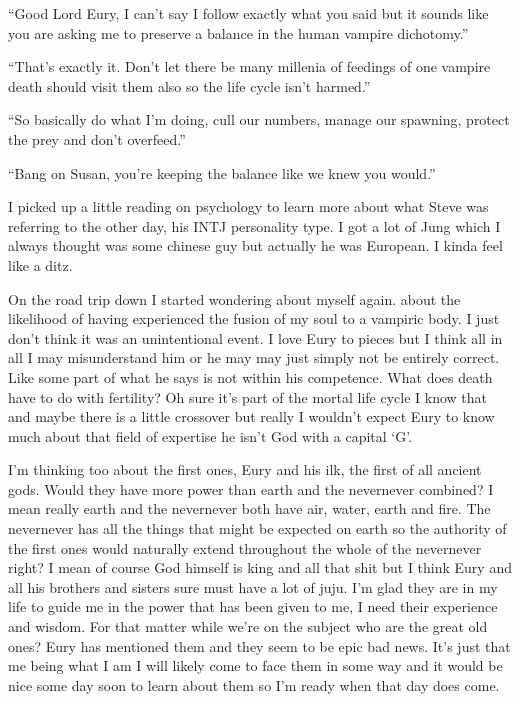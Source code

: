 ``Good Lord Eury, I can't say I follow exactly what you said but it sounds like you are asking me to preserve a balance in the human vampire dichotomy.''

``That's exactly it. Don't let there be many millenia of feedings of one vampire death should visit them also so the life cycle isn't harmed.''

``So basically do what I'm doing, cull our numbers, manage our spawning, protect the prey and don't overfeed.''

``Bang on Susan, you're keeping the balance like we knew you would.''

I picked up a little reading on psychology to learn more about what Steve was referring to the other day, his INTJ personality type. I got a lot of Jung which I always thought was some chinese guy but actually he was European. I kinda feel like a ditz.

\parasep

On the road trip down I started wondering about myself again. about the likelihood of having experienced the fusion of my soul to a vampiric body. I just don't think it was an unintentional event. I love Eury to pieces but I think all in all I may misunderstand him or he may may just simply not be entirely correct. Like some part of what he says is not within his competence. What does death have to do with fertility? Oh sure it's part of the mortal life cycle I know that and maybe there is a little crossover but really I wouldn't expect Eury to know much about that field of expertise he isn't God with a capital `G'.

I'm thinking too about the first ones, Eury and his ilk, the first of all ancient gods. Would they have more power than earth and the nevernever combined? I mean really earth and the nevernever both have air, water, earth and fire. The nevernever has all the things that might be expected on earth so the authority of the first ones would naturally extend throughout the whole of the nevernever right? I mean of course God himself is king and all that shit but I think Eury and all his brothers and sisters sure must have a lot of juju. I'm glad they are in my life to guide me in the power that has been given to me, I need their experience and wisdom. For that matter while we're on the subject who are the great old ones? Eury has mentioned them and they seem to be epic bad news. It's just that me being what I am I will likely come to face them in some way and it would be nice some day soon to learn about them so I'm ready when that day does come.

